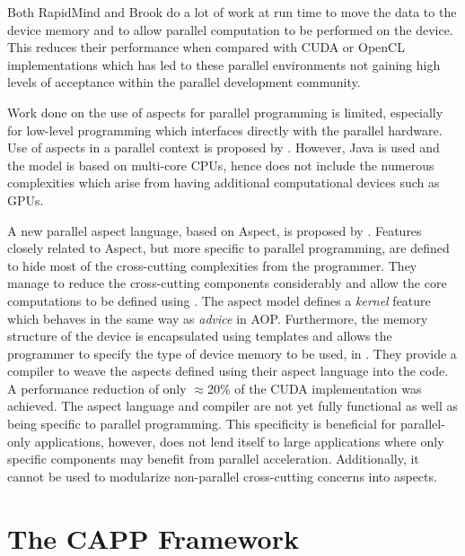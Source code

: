 \documentclass{sig-alternate-05-2015}
\begin{document}
Both RapidMind and Brook do a lot of work at run time to move the data to 
the device memory and to allow parallel computation to be performed on the
device. This
reduces their performance when compared with CUDA or OpenCL implementations 
\cite{rmindperf} which has led to these parallel environments not
gaining high levels of acceptance within the parallel development community.

Work done on the use of aspects for parallel programming is limited, especially
for low-level programming which interfaces directly with the parallel hardware.
Use of aspects in a parallel context is proposed by \cite{jaspect}.
However, Java is used and the model is based on multi-core CPUs, hence does not include the
numerous complexities which arise from having additional computational devices such
as GPUs.

A new parallel aspect language, based on Aspect\CPP, is proposed by
\cite{wang:aosp}. Features closely related to Aspect\CPP, but more specific to
parallel programming, are defined to hide most of the cross-cutting complexities from the
programmer. They manage to reduce the cross-cutting components considerably
and allow the core computations to be defined using \CPP. The aspect model defines 
a \textit{kernel} feature which behaves in the same way as \textit{advice} in AOP. 
Furthermore, the memory structure of the device is encapsulated using templates and allows the
programmer to specify the type of device memory to be used, in \CPP. They
provide a compiler to weave the aspects defined using their aspect language into 
the \CPP code. A performance reduction of only $\approx$20$\%$ of the CUDA
implementation was achieved. 
The aspect language and compiler are not yet fully functional as well as being
specific to parallel programming. This specificity is beneficial for parallel-only 
applications, however, does not lend itself to large \CPP applications
where only specific components may benefit from parallel acceleration.
Additionally, it cannot be used to modularize non-parallel cross-cutting concerns into
aspects.

\section{The CAPP Framework }\label{sec:aspects}
\end{document}
